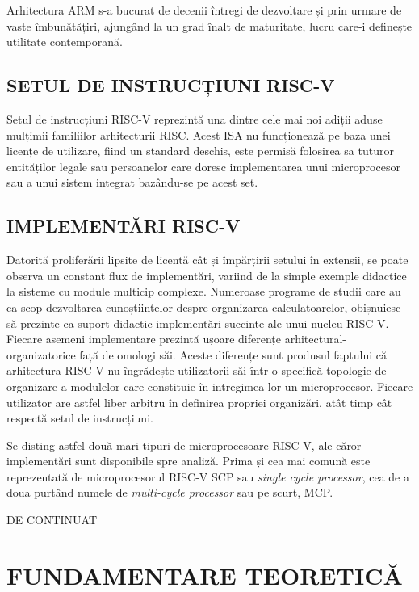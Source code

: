 \documentclass[12pt]{article}
\begin{document}
Arhitectura ARM s-a bucurat de decenii întregi de dezvoltare și prin urmare de vaste îmbunătățiri, ajungând la un grad înalt de maturitate, lucru care-i definește utilitate contemporană.

\subsection{SETUL DE INSTRUCȚIUNI RISC-V}
Setul de instrucțiuni RISC-V reprezintă una dintre cele mai noi adiții aduse mulțimii familiilor arhitecturii RISC. Acest ISA nu funcționează pe baza unei licențe de utilizare, fiind un standard deschis, este permisă folosirea sa tuturor entităților legale sau persoanelor care doresc implementarea unui microprocesor sau a unui sistem integrat bazându-se pe acest set.

\subsection{IMPLEMENTĂRI  RISC-V}
Datorită proliferării lipsite de licentă cât și împărțirii setului în extensii, se poate observa un constant flux de implementări, variind de la simple exemple didactice la sisteme cu module multicip complexe. Numeroase programe de studii care au ca scop dezvoltarea cunoștiintelor despre organizarea calculatoarelor, obișnuiesc să prezinte ca suport didactic implementări succinte ale unui nucleu RISC-V. Fiecare asemeni implementare prezintă ușoare diferențe arhitectural-organizatorice față de omologi săi. Aceste diferențe sunt produsul faptului că arhitectura RISC-V nu îngrădește utilizatorii săi într-o specifică topologie de organizare a modulelor care constituie în intregimea lor un microprocesor. Fiecare utilizator are astfel liber arbitru în definirea propriei organizări, atât timp cât respectă setul de instrucțiuni.

Se disting astfel două mari tipuri de microprocesoare RISC-V, ale căror implementări sunt disponibile spre analiză. Prima și cea mai comună este reprezentată de microprocesorul RISC-V SCP sau \textit{single cycle processor}, cea de a doua purtând numele de \textit{multi-cycle processor} sau pe scurt, MCP.


\begin{center}
\vspace*{60mm}
DE CONTINUAT
\end{center}

\newpage
\section{\centering FUNDAMENTARE TEORETICĂ}
\bigbreak
\end{document}
